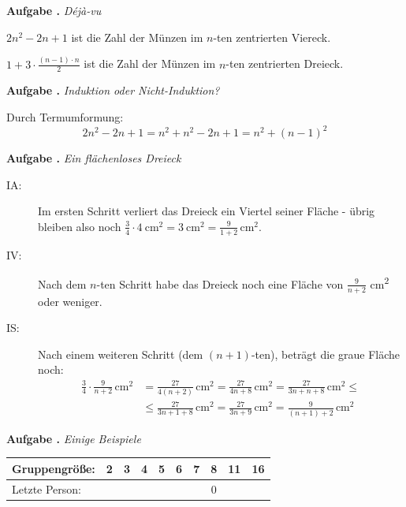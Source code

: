 \documentclass[a4paper,ngerman,12pt]{scrartcl}
\theoremstyle{definition}
\theoremstyle{plain}
\theoremstyle{remark}
\newlength{\aufgabenskip}
\newcounter{aufgabennummer}
\newenvironment{aufgabe}[1]{
	\addtocounter{aufgabennummer}{1}
	\textbf{Aufgabe \theaufgabennummer.} \emph{#1} \par
}{\vspace{\aufgabenskip}}
\begin{document}
\begin{aufgabe}{Déjà-vu}\label{aufg:dejavu}
	$2n^2-2n+1$ ist die Zahl der Münzen im $n$-ten zentrierten Viereck.
	
	
	$1 + 3\cdot\frac{(n-1)\cdot n}{2}$ ist die Zahl der Münzen im $n$-ten zentrierten Dreieck.
	
\end{aufgabe}

\begin{aufgabe}{Induktion oder Nicht-Induktion?}
	Durch Termumformung:
		\[2n^2-2n+1 = n^2 + n^2-2n+1 = n^2 + (n-1)^2\]
		
\end{aufgabe}


\begin{aufgabe}{Ein flächenloses Dreieck}
	\begin{description}
		\item[IA:] Im ersten Schritt verliert das Dreieck ein Viertel seiner Fläche - übrig bleiben also noch $\frac{3}{4}\cdot \SI{4}{\cm\squared} = \SI{3}{\cm\squared} = \frac{9}{1+2}\,\si{\cm\squared}$.
		\item[IV:] Nach dem $n$-ten Schritt habe das Dreieck noch eine Fläche von $\frac{9}{n+2}$ \si{\cm\squared} oder weniger.
		\item[IS:] Nach einem weiteren Schritt (dem $(n+1)$-ten), beträgt die graue Fläche noch:
			\begin{align*}
			\frac{3}{4}\cdot\frac{9}{n+2}\,\si{\cm\squared} &= \frac{27}{4(n+2)}\,\si{\cm\squared} = \frac{27}{4n+8}\,\si{\cm\squared} = \frac{27}{3n+n+8}\,\si{\cm\squared} \leq \\
			&\leq \frac{27}{3n+1+8}\,\si{\cm\squared} = \frac{27}{3n+9}\,\si{\cm\squared} = \frac{9}{(n+1)+2}\,\si{\cm\squared}
			\end{align*}
		\end{description}
\end{aufgabe}

\begin{aufgabe}{Einige Beispiele}\label{aufgabe:JosephusBspe}
	\begin{center}
		\renewcommand{\arraystretch}{2}\setlength{\tabcolsep}{1em}
		\begin{tabular}{l||c|c|c|c|c|c|c|c|c}
			Gruppengröße:	& 2	& 3 & 4 & 5 & 6 & 7 & 8 & 11 & 16 \\\hline
			Letzte Person:	&   &   &   &   &   &   & 0 &    &    
		\end{tabular}
	\end{center}
\end{aufgabe}
\end{document}
